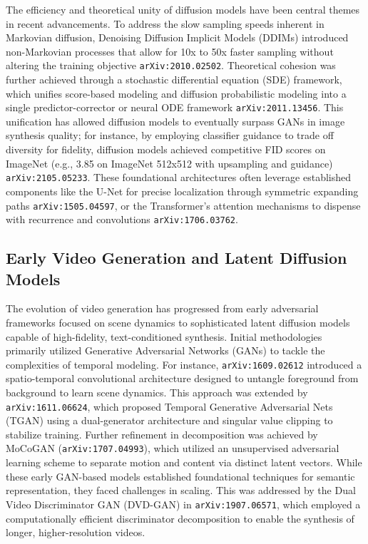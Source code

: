 \documentclass[11pt]{article}
\begin{document}
The efficiency and theoretical unity of diffusion models have been central themes in recent advancements. To address the slow sampling speeds inherent in Markovian diffusion, Denoising Diffusion Implicit Models (DDIMs) introduced non-Markovian processes that allow for 10x to 50x faster sampling without altering the training objective \texttt{arXiv:2010.02502}. Theoretical cohesion was further achieved through a stochastic differential equation (SDE) framework, which unifies score-based modeling and diffusion probabilistic modeling into a single predictor-corrector or neural ODE framework \texttt{arXiv:2011.13456}. This unification has allowed diffusion models to eventually surpass GANs in image synthesis quality; for instance, by employing classifier guidance to trade off diversity for fidelity, diffusion models achieved competitive FID scores on ImageNet (e.g., 3.85 on ImageNet 512x512 with upsampling and guidance) \texttt{arXiv:2105.05233}. These foundational architectures often leverage established components like the U-Net for precise localization through symmetric expanding paths \texttt{arXiv:1505.04597}, or the Transformer's attention mechanisms to dispense with recurrence and convolutions \texttt{arXiv:1706.03762}.

\subsection{Early Video Generation and Latent Diffusion Models}

The evolution of video generation has progressed from early adversarial frameworks focused on scene dynamics to sophisticated latent diffusion models capable of high-fidelity, text-conditioned synthesis. Initial methodologies primarily utilized Generative Adversarial Networks (GANs) to tackle the complexities of temporal modeling. For instance, \texttt{arXiv:1609.02612} introduced a spatio-temporal convolutional architecture designed to untangle foreground from background to learn scene dynamics. This approach was extended by \texttt{arXiv:1611.06624}, which proposed Temporal Generative Adversarial Nets (TGAN) using a dual-generator architecture and singular value clipping to stabilize training. Further refinement in decomposition was achieved by MoCoGAN (\texttt{arXiv:1707.04993}), which utilized an unsupervised adversarial learning scheme to separate motion and content via distinct latent vectors. While these early GAN-based models established foundational techniques for semantic representation, they faced challenges in scaling. This was addressed by the Dual Video Discriminator GAN (DVD-GAN) in \texttt{arXiv:1907.06571}, which employed a computationally efficient discriminator decomposition to enable the synthesis of longer, higher-resolution videos.
\end{document}
